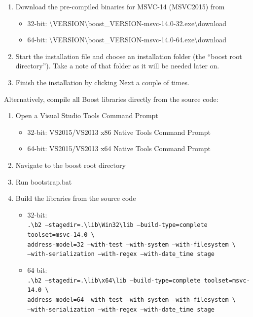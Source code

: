 \documentclass[12pt, a4paper]{article}
\newcommand{\bs}{\textbackslash}
\begin{document}
\begin{enumerate}
\item Download the pre-compiled binaries for MSVC-14 (MSVC2015) from \cite{boost-binaries}
\begin{itemize}
\item 32-bit: \cite{boost-binaries}{\bs}VERSION{\bs}boost\_VERSION-msvc-14.0-32.exe{\bs}download 
\item 64-bit: \cite{boost-binaries}{\bs}VERSION{\bs}boost\_VERSION-msvc-14.0-64.exe{\bs}download
\end{itemize}
\item Start the installation file and choose an installation folder (the ``boost root directory''). Take a note of that folder as it will be needed later on.   
\item Finish the installation by clicking Next a couple of times.
\end{enumerate}
    
Alternatively, compile all Boost libraries directly from the source code:

\begin{enumerate}
\item Open a Visual Studio Tools Command Prompt
\begin{itemize}
\item 32-bit: VS2015/VS2013 x86 Native Tools Command Prompt
\item 64-bit: VS2015/VS2013 x64 Native Tools Command Prompt
\end{itemize}
\item Navigate to the boost root directory
\item Run bootstrap.bat
\item Build the libraries from the source code
\begin{itemize}
\item 32-bit: \\
  {\footnotesize\tt .{\bs}b2 --stagedir=.{\bs}lib{\bs}Win32{\bs}lib --build-type=complete toolset=msvc-14.0 \bs \\
    address-model=32 --with-test --with-system --with-filesystem  \bs \\
    --with-serialization --with-regex --with-date\_time stage}
\item 64-bit: \\
  {\footnotesize\tt .{\bs}b2 --stagedir=.{\bs}lib{\bs}x64{\bs}lib --build-type=complete toolset=msvc-14.0 \bs \\
    address-model=64 --with-test --with-system --with-filesystem \bs \\
    --with-serialization --with-regex --with-date\_time stage}
\end{itemize}
\end{enumerate}
\end{document}
